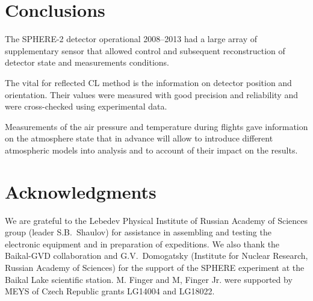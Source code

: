 \documentclass[final,5p,times,twocolumn]{elsarticle}
\begin{document}

\section{Conclusions \label{sect:conclusions}}
The SPHERE-2 detector operational 2008--2013 had a large array of supplementary sensor that allowed control and subsequent reconstruction of detector state and measurements conditions. 

The vital for reflected CL method is the information on detector position and orientation. Their values were measured with good precision and reliability and were cross-checked using experimental data.

Measurements of the air pressure and temperature during flights gave information on the atmosphere state that in advance will allow to introduce different atmospheric models into analysis and to account of their impact on the results.

  
\section{Acknowledgments}

We are grateful to the Lebedev Physical Institute of Russian Academy of Sciences group (leader S.B.~Shaulov) for assistance in assembling and testing the electronic equipment and in preparation of expeditions. We also thank the Baikal-GVD collaboration and G.V.~Domogatsky (Institute for Nuclear Research, Russian Academy of Sciences) for the support of the SPHERE experiment at the Baikal Lake scientific station.
M. Finger and M, Finger Jr. were supported by MEYS of Czech Republic grants LG14004 and LG18022.



\end{document}
